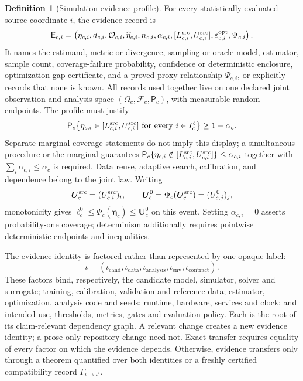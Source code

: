 \documentclass[11pt,a4paper]{article}
\theoremstyle{definition}
\newtheorem{definition}{Definition}[section]
\theoremstyle{plain}
\theoremstyle{remark}
\newcommand{\Prob}{\mathsf P}
\begin{document}
\begin{definition}[Simulation evidence profile]
For every statistically evaluated source coordinate \(i\), the evidence
record is
\[
\mathsf E_{c,i}
=
\left(
\eta_{c,i},d_{c,i},\mathcal O_{c,i},\widehat\eta_{c,i},n_{c,i},
\alpha_{c,i},[L^{\rm src}_{c,i},U^{\rm src}_{c,i}],
\varepsilon_{c,i}^{\rm opt},\Psi_{c,i}
\right).
\]
It names the estimand, metric or divergence, sampling or oracle model,
estimator, sample count, coverage-failure probability, confidence or
deterministic enclosure, optimization-gap certificate, and a proved proxy
relationship \(\Psi_{c,i}\), or explicitly records that none is known.
All records used together live on one declared joint observation-and-analysis
space \((\Omega_c,\mathcal F_c,\Prob_c)\), with measurable random endpoints.
The profile must justify
\[
\Prob_c\!\left\{
 \eta_{c,i}\in[L^{\rm src}_{c,i},U^{\rm src}_{c,i}]
 \ \text{for every }i\in I_c^\ell
\right\}\ge 1-\alpha_c .
\]
Separate marginal coverage statements do not imply this display; a
simultaneous procedure or the marginal guarantees
\(\Prob_c\{\eta_{c,i}\notin[L^{\rm src}_{c,i},U^{\rm src}_{c,i}]\}
\le\alpha_{c,i}\) together with
\(\sum_i\alpha_{c,i}\le\alpha_c\) is required.  Data reuse, adaptive search,
calibration, and dependence belong to the joint law.  Writing
\[
\boldsymbol U_c^{\rm src}
=(U^{\rm src}_{c,i})_i,\qquad
\boldsymbol U_c^0
=\Phi_c(\boldsymbol U_c^{\rm src})
=(U^0_{c,j})_j,
\]
monotonicity gives
\(\boldsymbol\ell_c^0\le\Phi_c(\boldsymbol\eta_c)
\le\boldsymbol U_c^0\) on this event.  Setting \(\alpha_{c,i}=0\)
asserts probability-one coverage; determinism additionally requires
pointwise deterministic endpoints and inequalities.

The evidence identity is factored rather than represented by one opaque
label:
\[
\iota
=
(\iota_{\mathrm{cand}},\iota_{\mathrm{data}},
 \iota_{\mathrm{analysis}},\iota_{\mathrm{env}},
 \iota_{\mathrm{contract}}).
\]
These factors bind, respectively, the candidate model, simulator, solver and
surrogate; training, calibration, validation and reference data; estimator,
optimization, analysis code and seeds; runtime, hardware, services and clock;
and intended use, thresholds, metrics, gates and evaluation policy.  Each is
the root of its claim-relevant dependency graph.  A relevant change creates
a new evidence identity; a prose-only repository change need not.  Exact
transfer requires equality of every factor on which the evidence depends.
Otherwise, evidence transfers only through a theorem quantified over both
identities or a freshly certified compatibility record
\(\Gamma_{\iota\to\iota'}\).
\end{definition}
\end{document}
